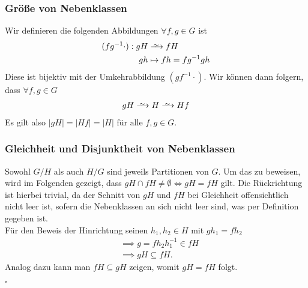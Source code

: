 \documentclass[12pt, german]{article}
\newcommand\iso{\xrightarrow{
		\,\smash{\raisebox{-0.65ex}{\ensuremath{\scriptstyle\sim}}}\,}}
\newcommand{\bewiesen}{
	
	\begin{flushright}
		$\square$  \\
\end{flushright}}
\begin{document}
	\subsubsection{Grö\ss e von Nebenklassen}
	Wir definieren die folgenden Abbildungen $	\forall f,g \in G$ ist
	\begin{align*}
		(fg^{-1} \cdot): gH &\iso fH \\
		gh &\mapsto fh = fg^{-1}gh
	\end{align*}
	Diese ist bijektiv mit der Umkehrabbildung $(gf^{-1}\cdot)$.
	Wir können dann folgern, dass $\forall f,g \in G$
	\begin{align*}
		gH \iso H \iso Hf 
	\end{align*} 
	Es gilt also $|gH| = |Hf| = |H|\text{ für alle } f,g \in G$.
	
	\subsubsection{Gleichheit und Disjunktheit von Nebenklassen}
	Sowohl $G/H$ als auch $H/G$ sind jeweils Partitionen von $G$.
	Um das zu beweisen, wird im Folgenden gezeigt, dass $gH \cap fH \not = \emptyset \iff gH = fH$ gilt.
	Die Rückrichtung ist hierbei trivial, da der Schnitt von $gH$ und $fH$ bei Gleichheit offensichtlich nicht leer ist, sofern die Nebenklassen an sich nicht leer sind, was per Definition gegeben ist. \\
	
	Für den Beweis der Hinrichtung seinen $h_1, h_2 \in H$ mit $gh_1 = fh_2$
	\begin{align*}
		&\implies g=fh_2h_1^{-1} \in fH \\
		&\implies gH \subseteq fH. 
	\end{align*}
	Analog dazu kann man $fH \subseteq gH$ zeigen, womit $gH = fH$ folgt.
	\bewiesen
	
\end{document}
